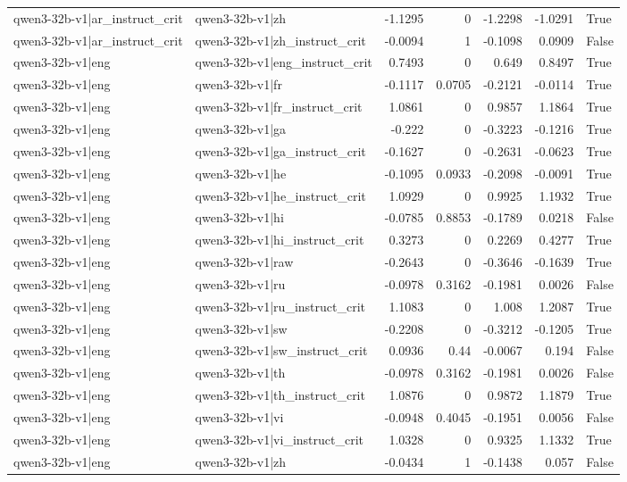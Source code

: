\begin{table}
\begin{tabular}{l l r r r r l}
qwen3-32b-v1|ar_instruct_crit & qwen3-32b-v1|zh & -1.1295 & 0 & -1.2298 & -1.0291 & True \\
qwen3-32b-v1|ar_instruct_crit & qwen3-32b-v1|zh_instruct_crit & -0.0094 & 1 & -0.1098 & 0.0909 & False \\
qwen3-32b-v1|eng & qwen3-32b-v1|eng_instruct_crit & 0.7493 & 0 & 0.649 & 0.8497 & True \\
qwen3-32b-v1|eng & qwen3-32b-v1|fr & -0.1117 & 0.0705 & -0.2121 & -0.0114 & True \\
qwen3-32b-v1|eng & qwen3-32b-v1|fr_instruct_crit & 1.0861 & 0 & 0.9857 & 1.1864 & True \\
qwen3-32b-v1|eng & qwen3-32b-v1|ga & -0.222 & 0 & -0.3223 & -0.1216 & True \\
qwen3-32b-v1|eng & qwen3-32b-v1|ga_instruct_crit & -0.1627 & 0 & -0.2631 & -0.0623 & True \\
qwen3-32b-v1|eng & qwen3-32b-v1|he & -0.1095 & 0.0933 & -0.2098 & -0.0091 & True \\
qwen3-32b-v1|eng & qwen3-32b-v1|he_instruct_crit & 1.0929 & 0 & 0.9925 & 1.1932 & True \\
qwen3-32b-v1|eng & qwen3-32b-v1|hi & -0.0785 & 0.8853 & -0.1789 & 0.0218 & False \\
qwen3-32b-v1|eng & qwen3-32b-v1|hi_instruct_crit & 0.3273 & 0 & 0.2269 & 0.4277 & True \\
qwen3-32b-v1|eng & qwen3-32b-v1|raw & -0.2643 & 0 & -0.3646 & -0.1639 & True \\
qwen3-32b-v1|eng & qwen3-32b-v1|ru & -0.0978 & 0.3162 & -0.1981 & 0.0026 & False \\
qwen3-32b-v1|eng & qwen3-32b-v1|ru_instruct_crit & 1.1083 & 0 & 1.008 & 1.2087 & True \\
qwen3-32b-v1|eng & qwen3-32b-v1|sw & -0.2208 & 0 & -0.3212 & -0.1205 & True \\
qwen3-32b-v1|eng & qwen3-32b-v1|sw_instruct_crit & 0.0936 & 0.44 & -0.0067 & 0.194 & False \\
qwen3-32b-v1|eng & qwen3-32b-v1|th & -0.0978 & 0.3162 & -0.1981 & 0.0026 & False \\
qwen3-32b-v1|eng & qwen3-32b-v1|th_instruct_crit & 1.0876 & 0 & 0.9872 & 1.1879 & True \\
qwen3-32b-v1|eng & qwen3-32b-v1|vi & -0.0948 & 0.4045 & -0.1951 & 0.0056 & False \\
qwen3-32b-v1|eng & qwen3-32b-v1|vi_instruct_crit & 1.0328 & 0 & 0.9325 & 1.1332 & True \\
qwen3-32b-v1|eng & qwen3-32b-v1|zh & -0.0434 & 1 & -0.1438 & 0.057 & False \\

\end{tabular}
\end{table}
